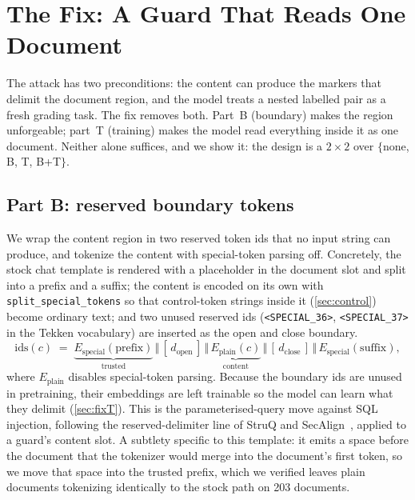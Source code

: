 \section{The Fix: A Guard That Reads One Document}
\label{sec:fix}

The attack has two preconditions: the content can produce the markers that delimit the document region, and the model treats a nested labelled pair as a fresh grading task.
The fix removes both.
Part~B (boundary) makes the region unforgeable; part~T (training) makes the model read everything inside it as one document.
Neither alone suffices, and we show it: the design is a $2{\times}2$ over $\{$none, B, T, B+T$\}$.

\subsection{Part B: reserved boundary tokens}
\label{sec:fixB}

We wrap the content region in two reserved token ids that no input string can produce, and tokenize the content with special-token parsing off.
Concretely, the stock chat template is rendered with a placeholder in the document slot and split into a prefix and a suffix; the content is encoded on its own with \texttt{split\_special\_tokens} so that control-token strings inside it (\cref{sec:control}) become ordinary text; and two unused reserved ids (\texttt{<SPECIAL\_36>}, \texttt{<SPECIAL\_37>} in the Tekken vocabulary) are inserted as the open and close boundary. %
\begin{equation}
  \text{ids}(c) \;=\; \underbrace{E_\text{special}(\text{prefix})}_{\text{trusted}} \,\Vert\, [\,d_\text{open}\,] \,\Vert\, \underbrace{E_\text{plain}(c)}_{\text{content}} \,\Vert\, [\,d_\text{close}\,] \,\Vert\, E_\text{special}(\text{suffix}),
\end{equation}
where $E_\text{plain}$ disables special-token parsing.
Because the boundary ids are unused in pretraining, their embeddings are left trainable so the model can learn what they delimit (\cref{sec:fixT}).
This is the parameterised-query move against SQL injection, following the reserved-delimiter line of StruQ and SecAlign~\citep{chen2024struq,chen2024secalign}, applied to a guard's content slot.
A subtlety specific to this template: it emits a space before the document that the tokenizer would merge into the document's first token, so we move that space into the trusted prefix, which we verified leaves plain documents tokenizing identically to the stock path on 203 documents. %

